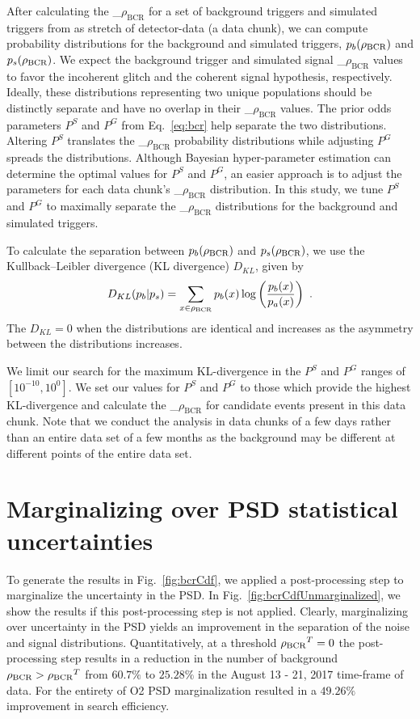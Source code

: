 \documentclass[%
 nofootinbib,
 amsmath,amssymb,
 aps,
 twocolumn,
 superscriptaddress
]{revtex4-2}
\newcommand{\mathcmd}[1]{{\sc \relax\ifmmode#1\else $#1$\fi}\xspace}
\newcommand{\bcr}{\mathcmd{\rho_\text{BCR}}}
\begin{document}
After calculating the \bcr for a set of background triggers and simulated triggers from as stretch of detector-data (a data chunk), we can compute probability distributions for the background and simulated triggers, $p_b(\bcr)$ and $p_s(\bcr)$. We expect the background trigger and simulated signal \bcr values to favor the incoherent glitch and the coherent signal hypothesis, respectively. Ideally, these distributions representing two unique populations should be distinctly separate and have no overlap in their \bcr values. The prior odds parameters $P^S$ and $P^G$ from Eq.~\ref{eq:bcr} help separate the two distributions. Altering $P^S$ translates the \bcr probability distributions while adjusting $P^G$ spreads the distributions. Although Bayesian hyper-parameter estimation can determine the optimal values for $P^S$ and $P^G$, an easier approach is to adjust the parameters for each data chunk's \bcr distribution. In this study, we tune $P^S$ and $P^G$ to maximally separate the \bcr distributions for the background and simulated triggers. 

To calculate the separation between $p_b(\bcr)$ and $p_s(\bcr)$, we use the Kullback--Leibler divergence (KL divergence) $D_{KL}$, given by
\begin{equation}
    D_{KL}(p_b | p_s) = \sum\limits_{x\in \bcr} p_b(x) \log \left( \frac{p_b(x)}{p_a(x)} \right)  \ .
\end{equation}
The $D_{KL}=0$ when the distributions are identical and increases as the asymmetry between the distributions increases. 

We limit our search for the maximum KL-divergence in the $P^S$ and $P^G$ ranges of $[10^{-10}, 10^0]$. We set our values for $P^S$ and $P^G$ to those which provide the highest KL-divergence and calculate the \bcr for candidate events present in this data chunk. Note that we conduct the analysis in data chunks of a few days rather than an entire data set of a few months as the background may be different at different points of the entire data set.

\section{Marginalizing over PSD statistical uncertainties}\label{sec:psd-marginalization}
To generate the results in Fig.~\ref{fig:bcrCdf}, we applied a post-processing step to marginalize the uncertainty in the PSD. In Fig.~\ref{fig:bcrCdfUnmarginalized}, we show the results if this post-processing step is not applied. Clearly, marginalizing over uncertainty in the PSD yields an improvement in the separation of the noise and signal distributions. Quantitatively, at a threshold $\bcr^T=0$ the post-processing step results in a reduction in the number of background $\bcr > \bcr^T$ from $60.7\%$ to $25.28\%$ in the August 13 - 21, 2017 time-frame of data. For the entirety of O2 PSD marginalization resulted in a $49.26\%$ improvement in search efficiency. 
\end{document}

